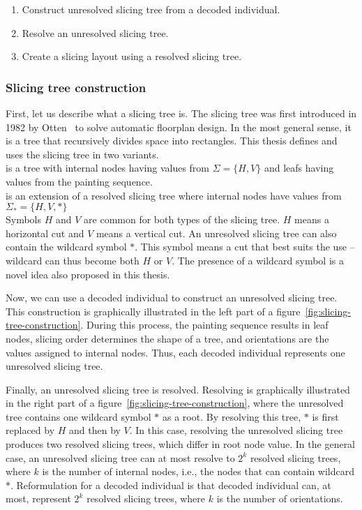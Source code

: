 \begin{enumerate}
    \item Construct unresolved slicing tree from a decoded individual.
    \item Resolve an unresolved slicing tree.
    \item Create a slicing layout using a resolved slicing tree.
\end{enumerate}

\subsubsection*{Slicing tree construction}

First, let us describe what a slicing tree is. 
The slicing tree was first introduced in 1982 by Otten~\cite{ottenAutomaticFloorplanDesign1982} to solve automatic floorplan design.
In the most general sense, it is a tree that recursively divides space into rectangles.
This thesis defines and uses the slicing tree in two variants.\\

 is a tree with internal nodes having values from $\Sigma = \{H, V\}$
and leafs having values from the painting sequence.\\

 is an extension of a resolved slicing tree where internal nodes have values from $\Sigma_* = \{H, V, *\}$ \\

Symbols $H$ and $V$ are common for both types of the slicing tree.
$H$ means a horizontal cut and $V$ means a vertical cut.
An unresolved slicing tree can also contain the wildcard symbol $*$.
This symbol means a cut that best suits the use – wildcard can thus become both $H$ or $V$.
The presence of a wildcard symbol is a novel idea also proposed in this thesis. 

Now, we can use a decoded individual to construct an unresolved slicing tree.
This construction is graphically illustrated in the left part of a figure~\ref{fig:slicing-tree-construction}.
During this process, the painting sequence results in leaf nodes, slicing order determines the shape of a tree, and orientations are the values assigned to internal nodes.
Thus, each decoded individual represents one unresolved slicing tree.

Finally, an unresolved slicing tree is resolved.
Resolving is graphically illustrated in the right part of a figure~\ref{fig:slicing-tree-construction},
where the unresolved tree contains one wildcard symbol $*$ as a root.
By resolving this tree, $*$ is first replaced by $H$ and then by $V$.
In this case, resolving the unresolved slicing tree produces two resolved slicing trees,
which differ in root node value.
In the general case, an unresolved slicing tree can at most resolve to $2^k$ resolved slicing trees,
where $k$ is the number of internal nodes, i.e., the nodes that can contain wildcard $*$.
Reformulation for a decoded individual is that decoded individual can, at most, represent
$2^k$ resolved slicing trees, where $k$ is the number of orientations.


